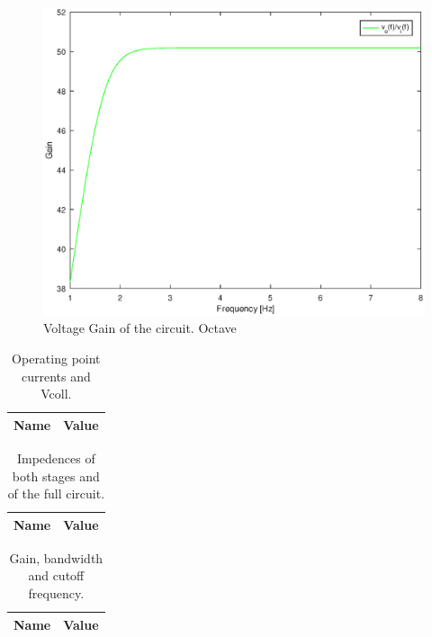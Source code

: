 \begin{figure}[h] \centering
\includegraphics[width=0.65\linewidth]{theo.eps}
\caption{Voltage Gain of the circuit. Octave}
\label{sh}
\end{figure}


\begin{table}[ht]
  \centering
  \begin{tabular}{|l|r|}
    \hline    
    {\bf Name} & {\bf Value} \\ \hline
    
  \end{tabular}
  \caption{Operating point currents and Vcoll.}
  \label{tab:1}
\end{table}


\begin{table}[ht]
  \centering
  \begin{tabular}{|l|r|}
    \hline    
    {\bf Name} & {\bf Value} \\ \hline
    
  \end{tabular}
  \caption{Impedences of both stages and of the full circuit.}
  \label{tab:2}
\end{table}



\begin{table}[ht]
  \centering
  \begin{tabular}{|l|r|}
    \hline    
    {\bf Name} & {\bf Value} \\ \hline
    
  \end{tabular}
  \caption{Gain, bandwidth and cutoff frequency.}
  \label{tab:3}
\end{table}












